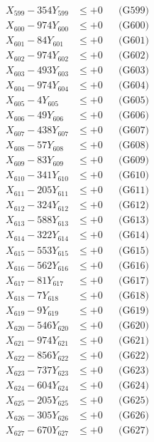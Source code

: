 \documentclass[a4paper,10pt]{article}
\begin{document}
{\begin{align}
X_{599} - 354Y_{599} &\leq +0 && \text{(G599)} \\
X_{600} - 974Y_{600} &\leq +0 && \text{(G600)} \\
\allowbreak
X_{601} - 84Y_{601} &\leq +0 && \text{(G601)} \\
X_{602} - 974Y_{602} &\leq +0 && \text{(G602)} \\
X_{603} - 493Y_{603} &\leq +0 && \text{(G603)} \\
X_{604} - 974Y_{604} &\leq +0 && \text{(G604)} \\
X_{605} - 4Y_{605} &\leq +0 && \text{(G605)} \\
X_{606} - 49Y_{606} &\leq +0 && \text{(G606)} \\
X_{607} - 438Y_{607} &\leq +0 && \text{(G607)} \\
X_{608} - 57Y_{608} &\leq +0 && \text{(G608)} \\
X_{609} - 83Y_{609} &\leq +0 && \text{(G609)} \\
X_{610} - 341Y_{610} &\leq +0 && \text{(G610)} \\
\allowbreak
X_{611} - 205Y_{611} &\leq +0 && \text{(G611)} \\
X_{612} - 324Y_{612} &\leq +0 && \text{(G612)} \\
X_{613} - 588Y_{613} &\leq +0 && \text{(G613)} \\
X_{614} - 322Y_{614} &\leq +0 && \text{(G614)} \\
X_{615} - 553Y_{615} &\leq +0 && \text{(G615)} \\
X_{616} - 562Y_{616} &\leq +0 && \text{(G616)} \\
X_{617} - 81Y_{617} &\leq +0 && \text{(G617)} \\
X_{618} - 7Y_{618} &\leq +0 && \text{(G618)} \\
X_{619} - 9Y_{619} &\leq +0 && \text{(G619)} \\
X_{620} - 546Y_{620} &\leq +0 && \text{(G620)} \\
\allowbreak
X_{621} - 974Y_{621} &\leq +0 && \text{(G621)} \\
X_{622} - 856Y_{622} &\leq +0 && \text{(G622)} \\
X_{623} - 737Y_{623} &\leq +0 && \text{(G623)} \\
X_{624} - 604Y_{624} &\leq +0 && \text{(G624)} \\
X_{625} - 205Y_{625} &\leq +0 && \text{(G625)} \\
X_{626} - 305Y_{626} &\leq +0 && \text{(G626)} \\
X_{627} - 670Y_{627} &\leq +0 && \text{(G627)} \\

\end{align}}
\end{document}
